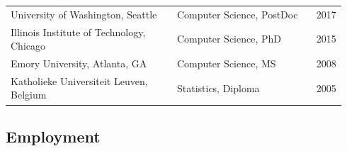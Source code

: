 \documentclass[11pt,]{scrartcl}
\newcommand{\arygap}{.9}
\begin{document}
\begin{table}[!h]
{\def\arraystretch{\arygap}\tabcolsep=0pt
\begin{tabular}{p{0.48\linewidth}p{0.4\linewidth}p{0.06\linewidth}}


% 


University of Washington, Seattle
& Computer Science, PostDoc
& \multicolumn{1}{r}{2017}
\\

Illinois Institute of Technology, Chicago
& Computer Science, PhD
& \multicolumn{1}{r}{2015}
\\

Emory University, Atlanta, GA
& Computer Science, MS
& \multicolumn{1}{r}{2008}
\\

Katholieke Universiteit Leuven, Belgium
& Statistics, Diploma
& \multicolumn{1}{r}{2005}





\end{tabular}%
}
\end{table}

\subsection{Employment}\label{appointments}
\end{document}
